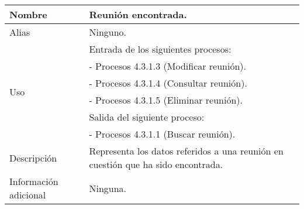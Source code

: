 \begin{center}
  \begin{tabular}{| l | p{9cm} |}
    \hline
    Nombre & \textbf{Reunión encontrada}.\\
    \hline
    Alias & Ninguno.\\
    \hline
    \multirow{6}{*}{Uso} & Entrada de los siguientes procesos:\\
                         & - Procesos 4.3.1.3 (Modificar reunión).\\
                         & - Procesos 4.3.1.4 (Consultar reunión).\\
                         & - Procesos 4.3.1.5 (Eliminar reunión).\\
                         & Salida del siguiente proceso:\\
                         & - Procesos 4.3.1.1 (Buscar reunión).\\
    \hline
    Descripción & Representa los datos referidos a una reunión en cuestión
                  que ha sido encontrada.\\
    \hline
    Información adicional & Ninguna.\\
    \hline
  \end{tabular}
\end{center}
